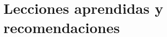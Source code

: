 
\chapter{Lecciones aprendidas y recomendaciones} %

\label{Chapter4} %
\label{Lecciones aprendidas y recomendaciones}


\newcommand{\keyword}[1]{\textbf{#1}}
\newcommand{\tabhead}[1]{\textbf{#1}}
\newcommand{\code}[1]{\texttt{#1}}
\newcommand{\file}[1]{\texttt{\bfseries#1}}
\newcommand{\option}[1]{\texttt{\itshape#1}}
\newcommand{\grados}{$^{\circ}$}

